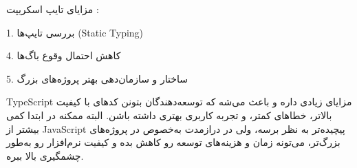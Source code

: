  مزایای تایپ اسکریپت : 

 1. بررسی تایپ‌ها (Static Typing)

 4. کاهش احتمال وقوع باگ‌ها

 5. ساختار و سازمان‌دهی بهتر پروژه‌های بزرگ

 TypeScript مزایای زیادی داره و باعث می‌شه که توسعه‌دهندگان بتونن کدهای با کیفیت بالاتر، خطاهای کمتر، و تجربه کاربری بهتری داشته باشن. البته ممکنه در ابتدا کمی بیشتر از JavaScript پیچیده‌تر به نظر برسه، ولی در درازمدت به‌خصوص در پروژه‌های بزرگ‌تر، می‌تونه زمان و هزینه‌های توسعه رو کاهش بده و کیفیت نرم‌افزار رو به‌طور چشمگیری بالا ببره.